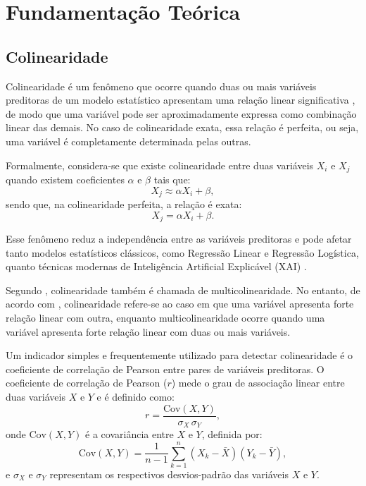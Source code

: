 
\chapter[Fundamentação Teórica]{Fundamentação Teórica}

\section{Colinearidade}\label{sec:colineariedade}

Colinearidade é um fenômeno que ocorre quando duas ou mais variáveis preditoras de um modelo estatístico apresentam uma relação linear significativa \cite{Carsten2012Collinearity}, de modo que uma variável pode ser aproximadamente expressa como combinação linear das demais. No caso de colinearidade exata, essa relação é perfeita, ou seja, uma variável é completamente determinada pelas outras.

Formalmente, considera-se que existe colinearidade entre duas variáveis $X_i$ e $X_j$ quando existem coeficientes $\alpha$ e $\beta$ tais que:
\begin{equation}
	X_j \approx \alpha X_i + \beta,
\end{equation}
sendo que, na colinearidade perfeita, a relação é exata:
\begin{equation}
	X_j = \alpha X_i + \beta.
\end{equation}

Esse fenômeno reduz a independência entre as variáveis preditoras e pode afetar tanto modelos estatísticos clássicos, como Regressão Linear e Regressão Logística, quanto técnicas modernas de Inteligência Artificial Explicável (XAI) \cite{salih2025a_perpective}.

Segundo , colinearidade também é chamada de multicolinearidade. No entanto, de acordo com , colinearidade refere-se ao caso em que uma variável apresenta forte relação linear com outra, enquanto multicolinearidade ocorre quando uma variável apresenta forte relação linear com duas ou mais variáveis.

Um indicador simples e frequentemente utilizado para detectar colinearidade é o coeficiente de correlação de Pearson entre pares de variáveis preditoras. O coeficiente de correlação de Pearson ($r$) mede o grau de associação linear entre duas variáveis $X$ e $Y$ e é definido como:
\begin{equation}
	r = \frac{\text{Cov}(X,Y)}{\sigma_X \, \sigma_Y},
\end{equation}
onde $\text{Cov}(X,Y)$ é a covariância entre $X$ e $Y$, definida por:
\begin{equation}
	\text{Cov}(X,Y) = \frac{1}{n-1} \sum_{k=1}^{n} (X_k - \bar{X})(Y_k - \bar{Y}),
\end{equation}
e $\sigma_X$ e $\sigma_Y$ representam os respectivos desvios-padrão das variáveis $X$ e $Y$.

